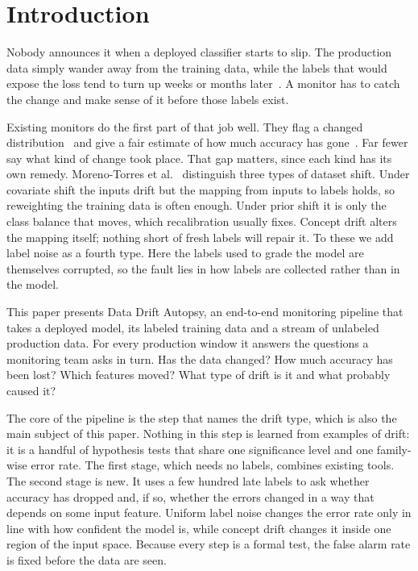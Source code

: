 \documentclass[pdflatex,sn-mathphys-num]{sn-jnl}
\begin{document}
\section{Introduction}\label{sec:intro}

Nobody announces it when a deployed classifier starts to slip. The production data simply wander away from the training data, while the labels that would expose the loss tend to turn up weeks or months later~\cite{rabanser2019failing}. A monitor has to catch the change and make sense of it before those labels exist.

Existing monitors do the first part of that job well. They flag a changed distribution~\cite{rabanser2019failing} and give a fair estimate of how much accuracy has gone~\cite{kivimaki2025performance}. Far fewer say what kind of change took place. That gap matters, since each kind has its own remedy. Moreno-Torres et al.~\cite{moreno2012unifying} distinguish three types of dataset shift. Under covariate shift the inputs drift but the mapping from inputs to labels holds, so reweighting the training data is often enough. Under prior shift it is only the class balance that moves, which recalibration usually fixes. Concept drift alters the mapping itself; nothing short of fresh labels will repair it. To these we add label noise as a fourth type. Here the labels used to grade the model are themselves corrupted, so the fault lies in how labels are collected rather than in the model.

This paper presents Data Drift Autopsy, an end-to-end monitoring pipeline that takes a deployed model, its labeled training data and a stream of unlabeled production data. For every production window it answers the questions a monitoring team asks in turn. Has the data changed? How much accuracy has been lost? Which features moved? What type of drift is it and what probably caused it?

The core of the pipeline is the step that names the drift type, which is also the main subject of this paper. Nothing in this step is learned from examples of drift: it is a handful of hypothesis tests that share one significance level and one family-wise error rate. The first stage, which needs no labels, combines existing tools. The second stage is new. It uses a few hundred late labels to ask whether accuracy has dropped and, if so, whether the errors changed in a way that depends on some input feature. Uniform label noise changes the error rate only in line with how confident the model is, while concept drift changes it inside one region of the input space. Because every step is a formal test, the false alarm rate is fixed before the data are seen.
\end{document}
